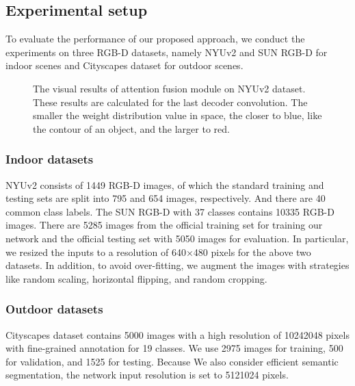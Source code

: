 \documentclass[journal,twoside,web]{ieeecolor}
\begin{document}
\subsection{Experimental setup}
To evaluate the performance of our proposed approach, we conduct the experiments on three RGB-D datasets, namely NYUv2 \cite{NYUv2}  and SUN RGB-D \cite{SUNRGB-D} for indoor scenes and Cityscapes \cite{Cityscapes} dataset for outdoor scenes. 
\begin{figure*}[!t]
	\centering
	\hspace{-0.60em}
	\hspace{-0.55em}
	\hspace{-0.55em}
	\hspace{-0.55em}
	\hspace{-0.55em}
	\hspace{-0.55em}
	\caption{The visual results of attention fusion module on NYUv2 dataset. These results are calculated for the last decoder convolution. The smaller the weight distribution value in space, the closer to blue, like the contour of an object, and the larger to red.}
	\label{AFM}
\end{figure*}

\subsubsection{Indoor datasets}
NYUv2 consists of 1449 RGB-D images, of which the standard training and testing sets are split into 795 and 654 images, respectively. And there are 40 common class labels. The SUN RGB-D with 37 classes contains 10335 RGB-D images. There are 5285 images from the official training set for training our network and the official testing set with 5050 images for evaluation. In particular, we resized the inputs to a resolution of 640×480 pixels for the above two datasets. In addition, to avoid over-fitting, we augment the images with strategies like random scaling, horizontal flipping, and random cropping. 

\subsubsection{Outdoor datasets}
Cityscapes dataset contains 5000 images with a high resolution of 10242048 pixels with fine-grained annotation for 19 classes. We use 2975 images for training, 500 for validation, and 1525 for testing. Because We also consider efficient semantic segmentation, the network input resolution is set to 5121024 pixels.
\end{document}
